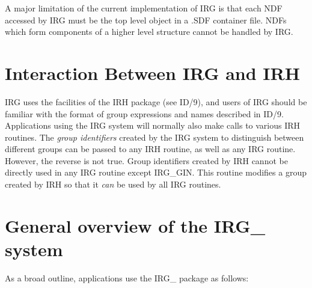 A major limitation of the current implementation of IRG is that each NDF
accessed by IRG must be the top level object in a .SDF container file. NDFs
which form components of a higher level structure cannot be handled by IRG.

\section {Interaction Between IRG and IRH}
IRG uses the facilities of the IRH package (see ID/9), and users of IRG should
be familiar with the format of group expressions and names described in ID/9.
Applications using the IRG system will normally also make calls to various IRH
routines. The {\em group identifiers} created by the IRG system to distinguish
between different groups can be passed to any IRH routine, as well as any IRG
routine. However, the reverse is not true. Group identifiers created by IRH 
cannot be directly used in any IRG routine except IRG\_GIN. This routine 
modifies a group created by IRH so that it {\em can} be used by all IRG 
routines.

\section {General overview of the IRG\_ system}
As a broad outline, applications use the IRG\_ package as follows:

